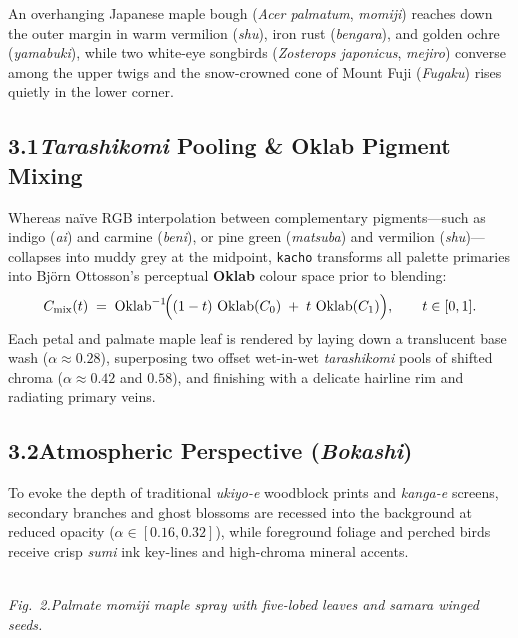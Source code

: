 \documentclass[11pt,a4paper,twoside]{article}
\begin{document}
An overhanging Japanese maple bough (\emph{Acer palmatum}, \emph{momiji}) reaches down the outer margin in warm vermilion (\emph{shu}), iron rust (\emph{bengara}), and golden ochre (\emph{yamabuki}), while two white-eye songbirds (\emph{Zosterops japonicus}, \emph{mejiro}) converse among the upper twigs and the snow-crowned cone of Mount Fuji (\emph{Fugaku}) rises quietly in the lower corner.

\subsection*{3.1\quad \emph{Tarashikomi} Pooling \& Oklab Pigment Mixing}

Whereas naïve RGB interpolation between complementary pigments---such as indigo (\emph{ai}) and carmine (\emph{beni}), or pine green (\emph{matsuba}) and vermilion (\emph{shu})---collapses into muddy grey at the midpoint, \texttt{kacho} transforms all palette primaries into Björn Ottosson's perceptual \textbf{Oklab} colour space prior to blending:
\[
  C_{\text{mix}}(t) \;=\; \operatorname{Oklab}^{-1}\!\Bigl((1 - t)\,\operatorname{Oklab}(C_0) \;+\; t\,\operatorname{Oklab}(C_1)\Bigr), \qquad t \in [0, 1].
\]
Each petal and palmate maple leaf is rendered by laying down a translucent base wash ($\alpha \approx 0.28$), superposing two offset wet-in-wet \emph{tarashikomi} pools of shifted chroma ($\alpha \approx 0.42$ and $0.58$), and finishing with a delicate hairline rim and radiating primary veins.

\subsection*{3.2\quad Atmospheric Perspective (\emph{Bokashi})}

To evoke the depth of traditional \emph{ukiyo-e} woodblock prints and \emph{kanga-e} screens, secondary branches and ghost blossoms are recessed into the background at reduced opacity ($\alpha \in [0.16, 0.32]$), while foreground foliage and perched birds receive crisp \emph{sumi} ink key-lines and high-chroma mineral accents.

\medskip
\begin{center}
\kachospray[width=0.80\linewidth, height=30mm, motif=maple, seed=27, from=right]\\[3pt]
{\small\itshape Fig.~2.\quad Palmate \emph{momiji} maple spray with five-lobed leaves and samara winged seeds.}
\end{center}
\medskip
\end{document}
